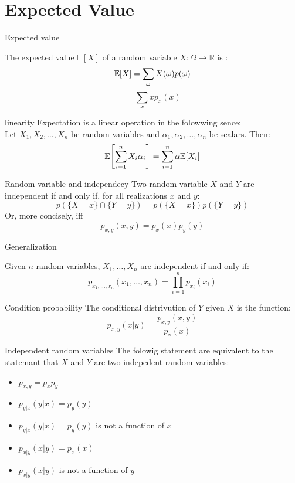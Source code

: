 \section{Expected Value}
\begin{parag}{Expected value}
    \begin{definition}
        The expected value $\mathbb{E}[X]$ of a random variable $X:  \Omega \to \mathbb{R}$ is : 
        \[\mathbb{E}[X] = \sum_\omega{X(\omega)p(\omega)}\]
        \[= \sum_x xp_x(x)\]
    \end{definition}
\end{parag}
\begin{parag}{linearity}
    Expectation is a linear operation in the folowwing sence:
    \\
    Let $X_1, X_2, \dots, X_n$ be random variables and $\alpha_1, \alpha_2, \dots, \alpha_n$ be scalars. Then:
    \[\E \left[\sum_{i=1}^n X_i\alpha_i\right] = \sum_{i=1}^n\alpha\E [X_i]\]
\end{parag}
\begin{parag}{Random variable and independecy}
    Two random variable $X$ and $Y$ are independent if and only if, for all realizations $x$ and $y$:
    \[p(\{X = x\} \cap \{Y = y\}) = p(\{X = x\}) p(\{Y = y\})\]
    Or, more concisely, iff
    \[p_{x, y}(x, y) = p_x(x)p_y(y)\]
\end{parag}
\begin{parag}{Generalization}
    \begin{theoreme}
        Given $n$ random variables, $X_1, \dots, X_n$ are independent if and only if:
        \[p_{x_1, \dots, x_n}(x_1, \dots, x_n) = \prod_{i = 1}^n p_{x_i}(x_i) \]
    \end{theoreme}
\end{parag}
\begin{parag}{Condition probability}
    The conditional distrivution of $Y$ given $X$ is the function: 
    \[p_{x, y}(x|y) = \frac{p_{x, y}(x, y)}{p_x(x)}\]
\end{parag}
\begin{parag}{Independent random variables}
    The folowig statement are equivalent to the statemant that $X$ and $Y$ are two indepedent random variables:
    \begin{itemize}
        \item $p_{x, y} = p_xp_y$
        \item $p_{y|x}(y|x) = p_y(y)$
        \item $p_{y|x}(y|x) = p_y(y)$ is not a function of $x$
        \item $p_{x|y}(x|y) = p_x(x)$
        \item $p_{x|y}(x|y)$ is not a function of $y$
    \end{itemize}
\end{parag}

